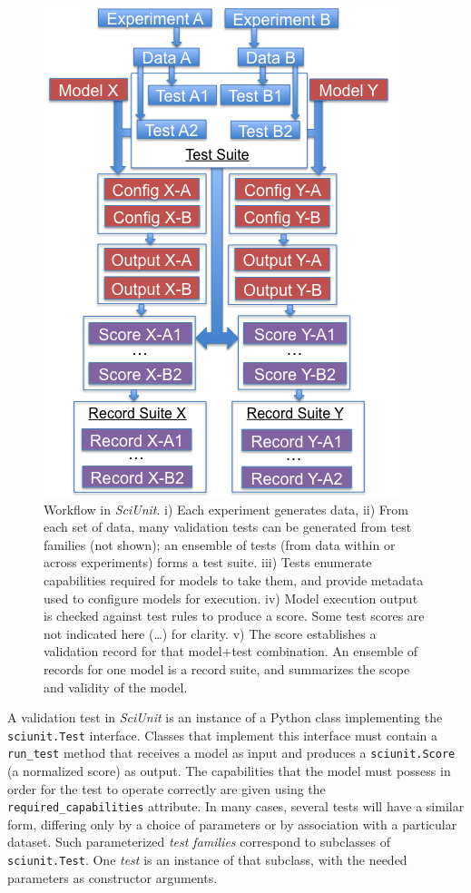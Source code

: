 \documentclass[11pt,letterpaper]{article}
\begin{document}
\begin{figure}
\includegraphics[scale=0.5]{sciunit_flowchart.png}
\caption{Workflow in \textit{SciUnit}. \scriptsize{i) Each experiment generates data, ii) From each set of data, many validation tests can be generated from test families (not shown); an ensemble of tests (from data within or across experiments) forms a test suite.  iii) Tests enumerate capabilities required for models to take them, and provide metadata used to configure models for execution.  iv) Model execution output is checked against test rules to produce a score.  Some test scores are not indicated here (…) for clarity.  v) The score establishes a validation record for that model+test combination.  An ensemble of records for one model is a record suite, and summarizes the scope and validity of the model.}}
\label{fig:sciunit_flowchart}
\end{figure}

A validation test in \textit{SciUnit} is an instance of a Python class implementing the \verb|sciunit.Test| interface. Classes that implement this interface must contain a \verb|run_test| method that receives a model as input and produces a \verb|sciunit.Score| (a normalized score) as output. The capabilities that the model must possess in order for the test to operate correctly are given using the \verb|required_capabilities| attribute. In many cases, several tests will have a similar form, differing only by a choice of parameters or by association with a particular dataset. Such parameterized \textit{test families} correspond to subclasses of \verb|sciunit.Test|.  One \textit{test} is an instance of that subclass, with the needed parameters as constructor arguments. 
\end{document}
